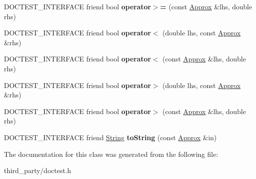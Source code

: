 \begin{DoxyCompactItemize}
\item 
\mbox{\label{classdoctest_1_1_approx_a52e1bcec19171f0ec55cc3a280188a03}} 
D\+O\+C\+T\+E\+S\+T\+\_\+\+I\+N\+T\+E\+R\+F\+A\+CE friend bool {\bfseries operator$>$=} (const \mbox{\hyperlink{classdoctest_1_1_approx}{Approx}} \&lhs, double rhs)
\item 
\mbox{\label{classdoctest_1_1_approx_acf32148e34dc6444a3bb4b16e7298279}} 
D\+O\+C\+T\+E\+S\+T\+\_\+\+I\+N\+T\+E\+R\+F\+A\+CE friend bool {\bfseries operator$<$} (double lhs, const \mbox{\hyperlink{classdoctest_1_1_approx}{Approx}} \&rhs)
\item 
\mbox{\label{classdoctest_1_1_approx_a54ce2536ed164b79688f43e373dcbf7b}} 
D\+O\+C\+T\+E\+S\+T\+\_\+\+I\+N\+T\+E\+R\+F\+A\+CE friend bool {\bfseries operator$<$} (const \mbox{\hyperlink{classdoctest_1_1_approx}{Approx}} \&lhs, double rhs)
\item 
\mbox{\label{classdoctest_1_1_approx_a97a6e92b9c9dacc0adb2f76f9faf2924}} 
D\+O\+C\+T\+E\+S\+T\+\_\+\+I\+N\+T\+E\+R\+F\+A\+CE friend bool {\bfseries operator$>$} (double lhs, const \mbox{\hyperlink{classdoctest_1_1_approx}{Approx}} \&rhs)
\item 
\mbox{\label{classdoctest_1_1_approx_a12a93e1726180db4091cb2e3b8ba5e30}} 
D\+O\+C\+T\+E\+S\+T\+\_\+\+I\+N\+T\+E\+R\+F\+A\+CE friend bool {\bfseries operator$>$} (const \mbox{\hyperlink{classdoctest_1_1_approx}{Approx}} \&lhs, double rhs)
\item 
\mbox{\label{classdoctest_1_1_approx_aa1ba324952b7844d35fc569b1c6c139a}} 
D\+O\+C\+T\+E\+S\+T\+\_\+\+I\+N\+T\+E\+R\+F\+A\+CE friend \mbox{\hyperlink{classdoctest_1_1_string}{String}} {\bfseries to\+String} (const \mbox{\hyperlink{classdoctest_1_1_approx}{Approx}} \&in)
\end{DoxyCompactItemize}


The documentation for this class was generated from the following file\+:\begin{DoxyCompactItemize}
\item 
third\+\_\+party/doctest.\+h\end{DoxyCompactItemize}
